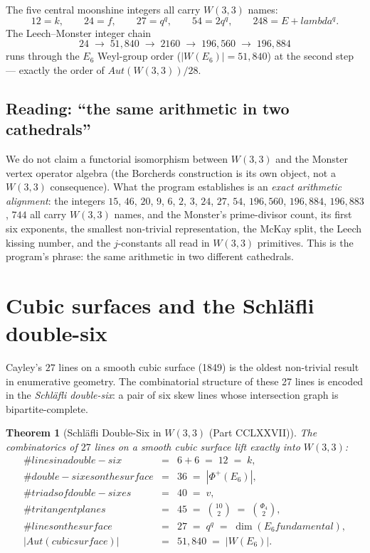 \documentclass[11pt]{article}
\def\mathrm#1{#1}%
\def\textbf#1{#1}%
\def\text#1{#1}%
\def\lambda{lambda}%
\def\Phi#1{Phi#1}%
\newtheorem*{theorem}{Theorem}
\begin{document}
The five central moonshine integers all carry $W(3,3)$ names:
\[
12 = k, \qquad 24 = f, \qquad 27 = q^q, \qquad 54 = 2q^q, \qquad 248 = E + \lambda^q.
\]
The Leech--Monster integer chain
\[
24 \;\longrightarrow\; 51{,}840 \;\longrightarrow\; 2160 \;\longrightarrow\; 196{,}560 \;\longrightarrow\; 196{,}884
\]
runs through the $E_6$ Weyl-group order ($|W(E_6)| = 51{,}840$) at the second step --- exactly the order of $\mathrm{Aut}(W(3,3))/28$.

\subsection*{Reading: ``the same arithmetic in two cathedrals''}

We do not claim a functorial isomorphism between $W(3,3)$ and the Monster vertex operator algebra (the Borcherds construction is its own object, not a $W(3,3)$ consequence). What the program establishes is an \emph{exact arithmetic alignment}: the integers $15$, $46$, $20$, $9$, $6$, $2$, $3$, $24$, $27$, $54$, $196{,}560$, $196{,}884$, $196{,}883$, $744$ all carry $W(3,3)$ names, and the Monster's prime-divisor count, its first six exponents, the smallest non-trivial representation, the McKay split, the Leech kissing number, and the $j$-constants all read in $W(3,3)$ primitives. This is the program's phrase: \textbf{the same arithmetic in two different cathedrals}.

\section{Cubic surfaces and the Schläfli double-six}

\label{sec:schlafli}

\textbf{Cayley's $27$ lines on a smooth cubic surface} (1849) is the oldest non-trivial result in enumerative geometry. The combinatorial structure of these 27 lines is encoded in the \emph{Schläfli double-six}: a pair of six skew lines whose intersection graph is bipartite-complete.

\begin{theorem}[Schläfli Double-Six in $W(3,3)$ (Part CCLXXVII)]
The combinatorics of $27$ lines on a smooth cubic surface lift exactly into $W(3,3)$:
\[
\begin{array}{lcl}
\#\text{lines in a double-six} & = & 6 + 6 \;=\; 12 \;=\; k, \\
\#\text{double-sixes on the surface} & = & 36 \;=\; |\Phi^+(E_6)|, \\
\#\text{triads of double-sixes} & = & 40 \;=\; v, \\
\#\text{tritangent planes} & = & 45 \;=\; \binom{10}{2} \;=\; \binom{\Phi_4}{2}, \\
\#\text{lines on the surface} & = & 27 \;=\; q^q \;=\; \dim(E_6\text{ fundamental}), \\
|\mathrm{Aut}(\text{cubic surface})| & = & 51{,}840 \;=\; |W(E_6)|.
\end{array}
\]
\end{theorem}
\end{document}

